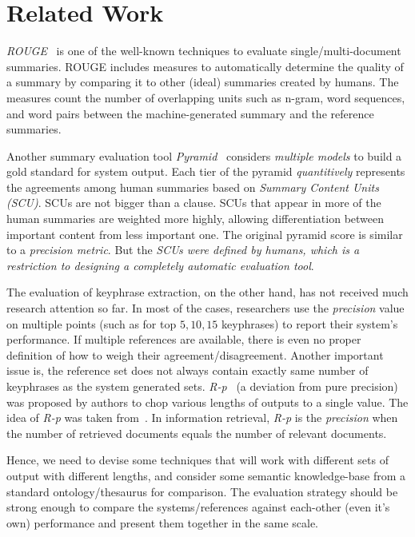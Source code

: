 \documentclass[a4paper]{report}
\begin{document}
\section{Related Work}
\emph{ROUGE}~\cite{Lin04rouge:a} is one of the well-known techniques to evaluate single/multi-document summaries. ROUGE includes measures to automatically determine the quality of a summary by comparing it to other (ideal) summaries created by humans. The measures count the number of overlapping units such as n-gram, word sequences, and word pairs between the machine-generated summary and the reference summaries.
\par Another summary evaluation tool \emph{Pyramid}~\cite{Nenkova:2007:PMI:1233912.1233913} considers \emph{multiple models} to build a gold standard for system output. Each tier of the pyramid \emph{quantitively} represents the agreements among human summaries based on \emph{Summary Content Units (SCU)}. SCUs are not bigger than a clause. SCUs that appear in more of the human summaries are weighted more highly, allowing differentiation between important content from less important one. The original pyramid score is similar to a \emph{precision metric}. But the \emph{SCUs were defined by humans, which is a restriction to designing a completely automatic evaluation tool}.
\par The evaluation of keyphrase extraction, on the other hand, has not received much research attention so far. In most of the cases, researchers use the \emph{precision} value on multiple points (such as for top $5, 10, 15$ keyphrases) to report their system's performance. If multiple references are available, there is even no proper definition of how to weigh their agreement/disagreement. Another important issue is, the reference set does not always contain exactly same number of keyphrases as the system generated sets. \emph{R-p}~\cite{DBLP:conf/ranlp/ZeschG09} (a deviation from pure precision) was proposed by authors to chop various lengths of outputs to a single value. The idea of \emph{R-p} was taken from~\cite{Salton:1986:IMI:576628}. In information retrieval, \emph{R-p} is the \emph{precision} when the number of retrieved documents equals the number of relevant documents. 

\par Hence, we need to devise some techniques that will work with different sets of output with different lengths, and consider some semantic knowledge-base from a standard ontology/thesaurus for comparison. The evaluation strategy should be strong enough to compare the systems/references against each-other (even it's own) performance and present them together in the same scale.
\end{document}

